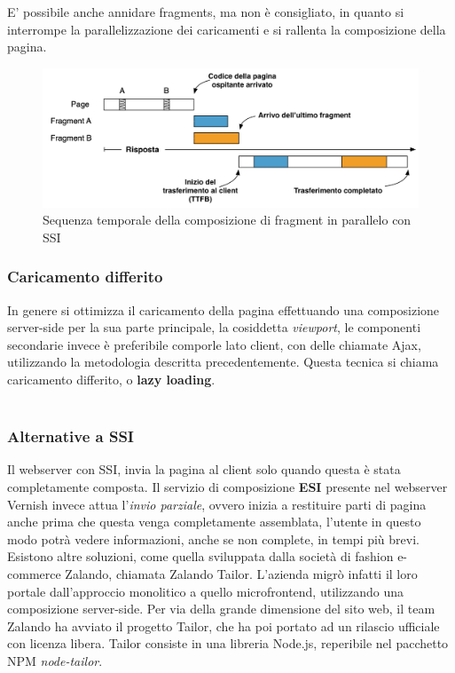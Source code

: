 E' possibile anche annidare fragments, ma non è consigliato, in quanto si 
interrompe la parallelizzazione dei caricamenti e si rallenta la composizione della pagina.
\begin{figure}[H]
    \centering
    \includegraphics[width=140mm]{img/ssi parallelo}
    \caption{Sequenza temporale della composizione di fragment in parallelo con SSI}
  \end{figure}

\subsubsection{Caricamento differito}
In genere si ottimizza il caricamento della pagina effettuando una composizione server-side per la sua parte principale,
 la cosiddetta \emph{viewport}, le componenti secondarie invece è preferibile comporle lato client, con 
delle chiamate Ajax, utilizzando la metodologia descritta precedentemente. Questa tecnica si chiama caricamento differito, o \textbf{lazy loading}.
\\\\
\subsubsection{Alternative a SSI}
Il webserver con SSI, invia la pagina al client solo quando questa è stata completamente composta.
Il servizio di composizione \textbf{ESI} presente nel webserver Vernish invece attua l'\emph{invio parziale},
 ovvero inizia a restituire parti di pagina anche prima che questa venga completamente assemblata, 
 l'utente in questo modo potrà vedere informazioni, anche se non complete, in tempi più brevi.
\\
Esistono altre soluzioni, come quella sviluppata dalla società di fashion e-commerce Zalando, chiamata Zalando Tailor.
L'azienda migrò infatti il loro portale dall'approccio monolitico a quello microfrontend, utilizzando una composizione
server-side. Per via della grande dimensione del sito web, il team Zalando ha avviato il progetto Tailor, che ha poi portato ad un rilascio 
ufficiale con licenza libera. Tailor consiste in una libreria Node.js, reperibile nel pacchetto NPM \emph{node-tailor}.


